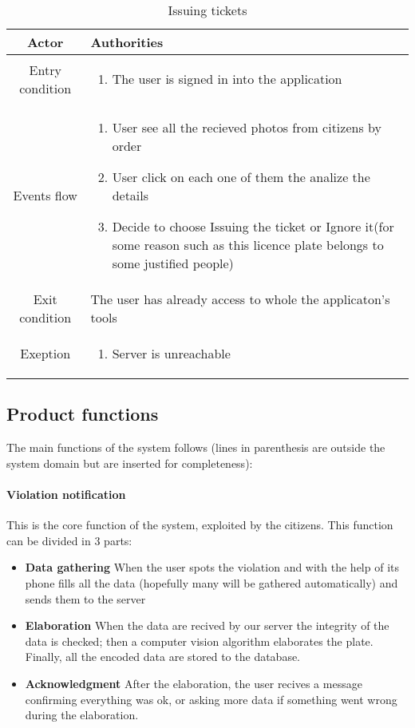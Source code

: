 \documentclass{article}
\begin{document}
		\begin{table} [H]
		\begin{center}
		\caption{Issuing tickets}
		\begin{tabular}{|c|p{8cm}|}
			\hline
			Actor&Authorities\\
			\hline
			Entry condition& \begin{enumerate}
								\item The user is signed in into the application
							\end{enumerate}\\
			\hline
			 Events flow& \begin{enumerate}
							\item User see all the recieved photos from citizens by order
							\item User click on each one of them the analize the details
							\item Decide to choose Issuing the ticket or Ignore it(for some reason such as this licence plate belongs to some justified people)
						\end{enumerate}\\
			\hline
			Exit condition& The user has already access to whole the applicaton's tools\\
			\hline
			Exeption& \begin{enumerate}
						\item Server is unreachable
					\end{enumerate}
		\\
			\hline
		\end{tabular}
		\end{center}
		\end{table} 
	\subsection{Product functions}
	The main functions of the system follows (lines in parenthesis are outside the system domain but are inserted for completeness):
		\paragraph{Violation notification}
			This is the core function of the system, exploited by the citizens.
			This function can be divided in 3 parts:
				\begin{itemize}
					\item \textbf{Data gathering}
					When the user spots the violation and with the help of its phone fills all the data (hopefully many will be gathered automatically) and sends them to the server
					\item \textbf{Elaboration}
					When the data are recived by our server the integrity of the data is checked; then a computer vision algorithm elaborates the plate. Finally, all the encoded data are stored to the database.
					\item \textbf{Acknowledgment}
					After the elaboration, the user recives a message confirming everything was ok, or asking more data if something went wrong during the elaboration.
				\end{itemize}
				
\end{document}

